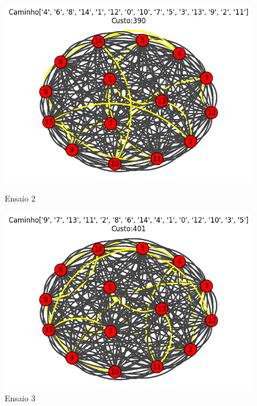\documentclass[12pt]{article}
\begin{document}
\begin{figure}[h!]
    \begin{minipage}{0.4\textwidth}
        \centering
        \includegraphics[width=\linewidth]{imgs/grafo_ensaio2.png}
        \caption{Ensaio 2}
        \label{ensaio2}
    \end{minipage}
    \hfill
    \begin{minipage}{0.4\textwidth}
        \centering
        \includegraphics[width=\linewidth]{imgs/grafo_ensaio3.png}
        \caption{Ensaio 3}
        \label{ensaio3}
    \end{minipage}
    
    \label{resultados}
\end{figure}



\end{document}
